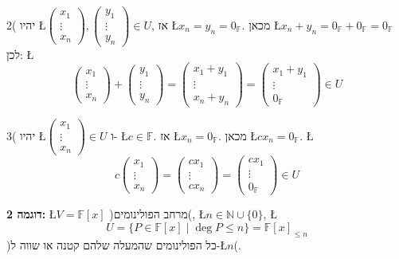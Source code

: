 \documentclass[english,hebrew]{article}
\begin{document}
2( יהיו \L{$\begin{pmatrix}x_{1}\\
\vdots\\
x_{n}
\end{pmatrix},\begin{pmatrix}y_{1}\\
\vdots\\
y_{n}
\end{pmatrix}\in U$}, אז \L{$x_{n}=y_{n}=0_{\mathbb{F}}$}. מכאן \L{$x_{n}+y_{n}=0_{\mathbb{F}}+0_{\mathbb{F}}=0_{\mathbb{F}}$}
לכן: \L{%
\[
\begin{pmatrix}x_{1}\\
\vdots\\
x_{n}
\end{pmatrix}+\begin{pmatrix}y_{1}\\
\vdots\\
y_{n}
\end{pmatrix}=\begin{pmatrix}x_{1}+y_{1}\\
\vdots\\
x_{n}+y_{n}
\end{pmatrix}=\begin{pmatrix}x_{1}+y_{1}\\
\vdots\\
0_{\mathbb{F}}
\end{pmatrix}\in U
\]
}%

3( יהיו \L{$\begin{pmatrix}x_{1}\\
\vdots\\
x_{n}
\end{pmatrix}\in U$} ו- \L{$c\in\mathbb{F}$}. אז \L{$x_{n}=0_{\mathbb{F}}$}. מכאן \L{$cx_{n}=0_{\mathbb{F}}$}.
\L{%
\[
c\begin{pmatrix}x_{1}\\
\vdots\\
x_{n}
\end{pmatrix}=\begin{pmatrix}cx_{1}\\
\vdots\\
cx_{n}
\end{pmatrix}=\begin{pmatrix}cx_{1}\\
\vdots\\
0_{\mathbb{F}}
\end{pmatrix}\in U
\]
}%

\textbf{דוגמה 2:} \L{$V=\mathbb{F}[x]$} )מרחב הפולינומים(, \L{$n\in\mathbb{N}\cup\{0\}$},
\L{%
\[
U=\{P\in\mathbb{F}[x]\mid\deg P\le n\}=\mathbb{F}[x]_{\le n}
\]
}%
)כל הפולינומים שהמעלה שלהם קטנה או שווה ל-\L{$n$}(.
\end{document}
